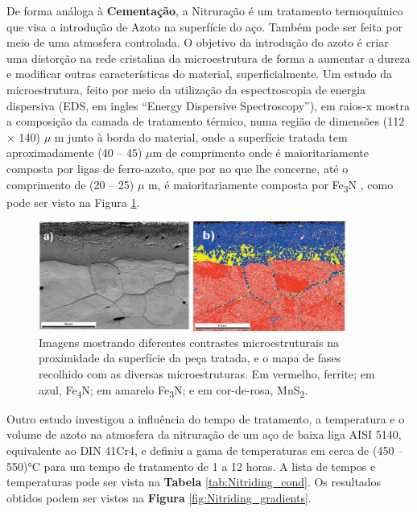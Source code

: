 De forma análoga à \textbf{Cementação}, a Nitruração é um tratamento termoquímico que visa a introdução de Azoto na superfície do aço. Também pode ser feita por meio de uma atmosfera controlada. O objetivo da introdução do azoto é criar uma distorção na rede cristalina da microestrutura de forma a aumentar a dureza e modificar outras características do material, superficialmente. Um estudo da microestrutura, feito por meio da utilização da espectroscopia de energia dispersiva (EDS, em ingles “Energy Dispersive Spectroscopy”), em raios-x mostra a composição da camada de tratamento térmico, numa região de dimensões (112 × 140) $\mu$ m junto à borda do material, onde a superfície tratada tem aproximadamente (40 – 45) $\mu$m de comprimento onde é maioritariamente composta por ligas de ferro-azoto, que por no que lhe concerne, até o comprimento de (20 – 25) $\mu$ m, é maioritariamente composta por Fe\textsubscript{3}N \cite{EDAX2023}, como pode ser visto na Figura \ref{fig:Nitriding_3_microstructure}.
\begin{figure}[htb]
    \centering
    \includegraphics[width = 0.9\textwidth]{Figures/Cap2/Nitriding_3_microstructure.png}
    \caption[Microestruturas de uma peça tratada por nitruração]%
    {Imagens mostrando diferentes contrastes microestruturais na proximidade da superfície da peça tratada\cite{EDAX2023}, e o mapa de fases recolhido com as diversas microestruturas. Em vermelho, ferrite; em azul, Fe\textsubscript{4}N; em amarelo Fe\textsubscript{3}N; e em cor-de-rosa, MnS\textsubscript{2}.}
    \label{fig:Nitriding_3_microstructure}
\end{figure}
\newpage
\par
Outro estudo investigou a influência do tempo de tratamento, a temperatura e o volume de azoto na atmosfera da nitruração de um aço de baixa liga AISI 5140, equivalente ao DIN 41Cr4, e definiu a gama de temperaturas em cerca de (450 – 550)°C para um tempo de tratamento de 1 a 12 horas\cite{Karaoglu2002}. A lista de tempos e temperaturas pode ser vista na \textbf{Tabela} \ref{tab:Nitriding_cond}. Os resultados obtidos podem ser vistos na \textbf{Figura} \ref{fig:Nitriding_gradients}.
